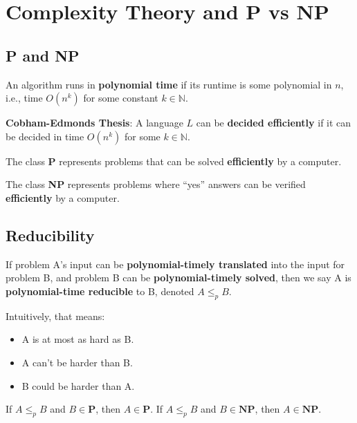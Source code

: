 \documentclass[12pt, letterpaper, oneside]{book}
\begin{document}
\chapter{Complexity Theory and P vs NP}

\section{\textbf{P} and \textbf{NP}}

An algorithm runs in \textbf{polynomial time} if its runtime is some polynomial in $n$, i.e., time $O(n^k)$ for some
constant $k \in \mathbb{N}$.

\textbf{Cobham-Edmonds Thesis}: A language $L$ can be \textbf{decided efficiently} if it can be decided in time $O(n^k)$
for some $k \in \mathbb{N}$.

The class \textbf{P} represents problems that can be solved \textbf{efficiently} by a computer.

The class \textbf{NP} represents problems where ``yes'' answers can be verified \textbf{efficiently} by a computer.

\section{Reducibility}

If problem A's input can be \textbf{polynomial-timely translated} into the input for problem B, and problem B can be
\textbf{polynomial-timely solved}, then we say A is \textbf{polynomial-time reducible} to B, denoted $A \le_p B$.

Intuitively, that means:
\begin{itemize}
  \item A is at most as hard as B.
  \item A can't be harder than B.
  \item B could be harder than A.
\end{itemize}

If $A \le_p B$ and $B \in \mathbf{P}$, then $A \in \mathbf{P}$. If $A \le_p B$ and $B \in \mathbf{NP}$, then
$A \in \mathbf{NP}$.

\end{document}
